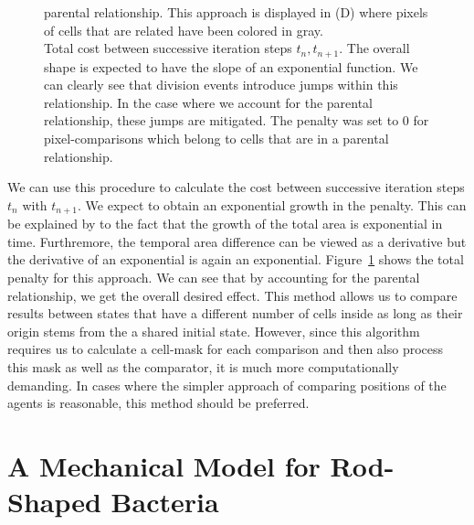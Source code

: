\documentclass{article}
\begin{document}
\begin{figure}[H]
{        parental relationship.
        This approach is displayed in (D) where pixels of cells that are related have been colored
        in gray.\\
        Total cost between successive iteration steps $t_n,t_{n+1}$.
        The overall shape is expected to have the slope of an exponential function.
        We can clearly see that division events introduce jumps within this relationship.
        In the case where we account for the parental relationship, these jumps are mitigated.
        The penalty was set to $0$ for pixel-comparisons which belong to cells that are in a
        parental relationship.
    }
    \label{fig:mask-difference-metric}
\end{figure}

We can use this procedure to calculate the cost between successive iteration steps
$t_n$ with $t_{n+1}$.
We expect to obtain an exponential growth in the penalty.
This can be explained by to the fact that the growth of the total area is exponential in time.
Furthremore, the temporal area difference can be viewed as a derivative but the derivative of an
exponential is again an exponential.
Figure~\ref{fig:mask-difference-metric} shows the total penalty for this approach.
We can see that by accounting for the parental relationship, we get the overall desired effect.
This method allows us to compare results between states that have a different number of cells
inside as long as their origin stems from the a shared initial state.
However, since this algorithm requires us to calculate a cell-mask for each comparison and then also
process this mask as well as the comparator, it is much more computationally demanding.
In cases where the simpler approach of comparing positions of the agents is reasonable, this method
should be preferred.

\section{A Mechanical Model for Rod-Shaped Bacteria}
\label{subsubsection:mechanical-model-rod-shaped-bacteria}
\end{document}
